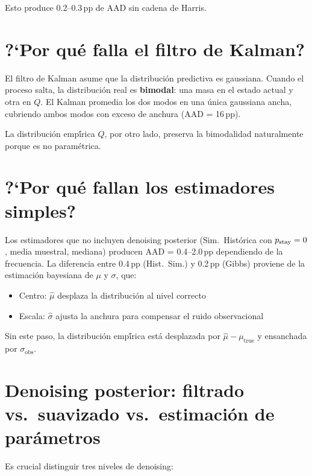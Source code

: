 Esto produce 0.2--0.3\,pp de AAD sin cadena de Harris.

\section{?`Por qu\'{e} falla el filtro de Kalman?}

El filtro de Kalman asume que la distribuci\'{o}n predictiva es gaussiana.
Cuando el proceso salta, la distribuci\'{o}n real es \textbf{bimodal}: una masa en
el estado actual y otra en $Q$. El Kalman promedia los dos modos en una \'{u}nica
gaussiana ancha, cubriendo ambos modos con exceso de anchura (AAD = 16\,pp).

La distribuci\'{o}n emp\'{\'i}rica $Q$, por otro lado, preserva la bimodalidad
naturalmente porque es no param\'{e}trica.

\section{?`Por qu\'{e} fallan los estimadores simples?}

Los estimadores que no incluyen denoising posterior (Sim.\ Hist\'{o}rica con
$p_{\text{stay}} = 0$, media muestral, mediana) producen AAD = 0.4--2.0\,pp dependiendo
de la frecuencia. La diferencia entre 0.4\,pp (Hist.\ Sim.) y 0.2\,pp (Gibbs)
proviene de la estimaci\'{o}n bayesiana de $\mu$ y $\sigma$, que:
\begin{itemize}
    \item Centro: $\hat{\mu}$ desplaza la distribuci\'{o}n al nivel correcto
    \item Escala: $\hat{\sigma}$ ajusta la anchura para compensar el ruido observacional
\end{itemize}

Sin este paso, la distribuci\'{o}n emp\'{\'i}rica est\'{a} desplazada por
$\hat{\mu} - \mu_{\text{true}}$ y ensanchada por $\sigma_{\text{obs}}$.

\section{Denoising posterior: filtrado vs.\ suavizado vs.\ estimaci\'{o}n de par\'{a}metros}

Es crucial distinguir tres niveles de denoising:

